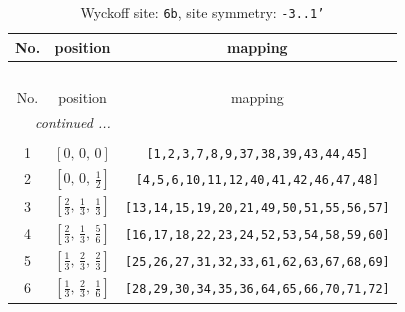 \documentclass[fleqn,8pt]{jsarticle}
\begin{document}
\begin{longtable}{ccc}
\caption{Wyckoff site: {\tt 6b}, site symmetry: {\tt -3..1'}}
 \\
 \hline \hline
No. & position & mapping \\ \hline \endfirsthead

\multicolumn{2}{l}{\tablename\ \thetable{}} \\
 \hline \hline
No. & position & mapping \\ \hline \endhead

 \hline \hline
\multicolumn{2}{r}{\footnotesize\it continued ...} \\ \endfoot

 \hline \hline
\multicolumn{2}{r}{} \\ \endlastfoot

1 & $\left[ 0,\, 0,\, 0 \right]$ & {\tt [1,2,3,7,8,9,37,38,39,43,44,45]} \\ \hline
2 & $\left[ 0,\, 0,\, \frac{1}{2} \right]$ & {\tt [4,5,6,10,11,12,40,41,42,46,47,48]} \\ \hline
3 & $\left[ \frac{2}{3},\, \frac{1}{3},\, \frac{1}{3} \right]$ & {\tt [13,14,15,19,20,21,49,50,51,55,56,57]} \\ \hline
4 & $\left[ \frac{2}{3},\, \frac{1}{3},\, \frac{5}{6} \right]$ & {\tt [16,17,18,22,23,24,52,53,54,58,59,60]} \\ \hline
5 & $\left[ \frac{1}{3},\, \frac{2}{3},\, \frac{2}{3} \right]$ & {\tt [25,26,27,31,32,33,61,62,63,67,68,69]} \\ \hline
6 & $\left[ \frac{1}{3},\, \frac{2}{3},\, \frac{1}{6} \right]$ & {\tt [28,29,30,34,35,36,64,65,66,70,71,72]} \\
\end{longtable}
\renewcommand{\arraystretch}{1.2}
\end{document}
